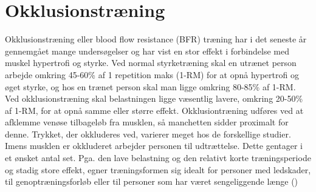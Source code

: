 \section{Okklusionstræning}
Okklusionstræning eller blood flow resistance (BFR) træning har i det seneste år gennemgået mange undersøgelser og har vist en stor effekt i forbindelse med muskel hypertrofi og styrke. Ved normal styrketræning skal en utrænet person arbejde omkring 45-60\% af 1 repetition maks (1-RM) for at opnå hypertrofi og øget styrke, og hos en trænet person skal man ligge omkring 80-85\% af 1-RM. Ved okklusionstræning skal belastningen ligge væsentlig lavere, omkring 20-50\% af 1-RM, for at opnå samme eller større effekt. 
Okklusiontræning udføres ved at afklemme venøse tilbageløb fra musklen, så manchetten sidder proximalt for denne. Trykket, der okkluderes ved, varierer meget hos de forskellige studier. Imens musklen er okkluderet arbejder personen til udtrættelse. Dette gentager i et ønsket antal set. 
Pga. den lave belastning og den relativt korte træningsperiode og stadig store effekt, egner træningsformen sig idealt for personer med ledskader, til genoptræningsforløb eller til personer som har været sengeliggende længe (\cite{RefWorks:38})









